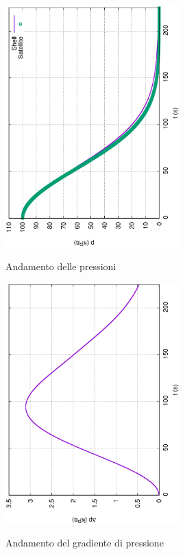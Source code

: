 \documentclass{article}
\begin{document}
        \clearpage

        \begin{figure}[h!]
            \centering
            \includegraphics[width=0.6\textwidth, angle=-90]{MUL2/Esercitazione1/2B/p.eps}
            \label{fig:press_10_6}
            \caption{Andamento delle pressioni} 
        \end{figure}

        \begin{figure}[h!]
            \centering
            \includegraphics[width=0.6\textwidth, angle=-90]{MUL2/Esercitazione1/2B/Dp.eps}
            \label{fig:grad_press_10_6}
            \caption{Andamento del gradiente di pressione}
        \end{figure}
        \clearpage
\end{document}
